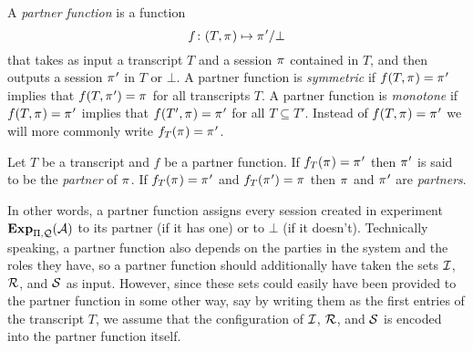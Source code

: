 \begin{definition}\label{def:partner_functions}
A \emph{partner function} is a function 
\begin{equation}
f \colon (T,\oracle) \mapsto  \oracle' / \bot 
\end{equation}
that takes as input a transcript $T$
and a session $\oracle$ contained in $T$,
and then outputs a  session $\oracle'$ in $T$ or $\bot$.
A partner function is \emph{symmetric} if $f(T, \oracle) = \oracle'$ implies  that $f(T,\oracle') = \oracle$ for all transcripts $T$.  
A partner function is \emph{monotone} if $f(T, \oracle) = \oracle'$ implies that $f(T', \oracle) = \oracle'$ for all $T \subseteq T'$.
Instead of $f(T, \oracle) = \oracle'$ we will more commonly write $f_T(\oracle) = \oracle'$.
\end{definition}

\begin{definition}[Partnering]
Let $T$ be a transcript and $f$ be a partner function.
If $f_T(\oracle) = \oracle'$ then $\oracle'$ is said to be the \emph{partner} of $\oracle$.
If $f_T(\oracle) = \oracle'$ and $f_T(\oracle') = \oracle$ then $\oracle$ and $\oracle'$ are \emph{partners}.
\end{definition}

In other words,
a partner function assigns every session created in experiment $\mathbf{Exp}_{\mathrm{\Pi},\mathcal{Q}}^{}(\mathcal{A})$ to its partner 
(if it has one) or to $\bot$ (if it doesn't).
Technically speaking,
a partner function also depends on the parties in the system and the roles they have,
so a partner function should additionally have taken the sets $\mathcal{I}$, $\mathcal{R}$, and $\mathcal{S}$ as  input.
However,
since these sets could easily have been provided to the partner function in some other way,
say by writing them as the first entries of the transcript $T$,
we assume that the configuration of $\mathcal{I}$, $\mathcal{R}$, and $\mathcal{S}$ is encoded into the partner function itself. 


